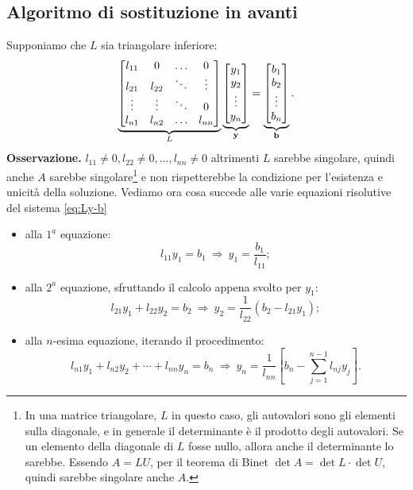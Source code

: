 \subsection{Algoritmo di sostituzione in avanti}
Supponiamo che $\displaystyle L$ sia triangolare inferiore:
\begin{equation}
\underbrace{\begin{bmatrix}
l_{11} & 0 & \dotsc  & 0\\
l_{21} & l_{22} & \ddots  & \vdots \\
\vdots  & \vdots  & \ddots  & 0\\
l_{n1} & l_{n2} & \dotsc  & l_{nn}
\end{bmatrix}}_{L}\underbrace{\begin{bmatrix}
y_{1}\\
y_{2}\\
\vdots \\
y_{n}
\end{bmatrix}}_{\mathbf{y}} =\underbrace{\begin{bmatrix}
b_{1}\\
b_{2}\\
\vdots \\
b_{n}
\end{bmatrix}}_{\mathbf{b}}.
\label{eq:Ly-b}
\end{equation}
\textbf{Osservazione. }$\displaystyle l_{11} \neq 0,l_{22} \neq 0,\dotsc ,l_{nn} \neq 0$ altrimenti $\displaystyle L$ sarebbe singolare, quindi anche $\displaystyle A$ sarebbe singolare\footnote{In una matrice triangolare, $L$ in questo caso, gli autovalori sono gli elementi sulla diagonale, e in generale il determinante è il prodotto degli autovalori. Se un elemento della diagonale di $L$ fosse nullo, allora anche il determinante lo sarebbe. Essendo $A=LU$, per il teorema di Binet $\operatorname{det}A=\operatorname{det}L\cdot\operatorname{det}U$, quindi sarebbe singolare anche $A$.}
e non rispetterebbe la condizione per l'esistenza e unicità della soluzione. Vediamo ora cosa succede alle varie equazioni risolutive del sistema \eqref{eq:Ly-b}
\begin{itemize}
\item alla $1^{a}$ equazione:
\begin{equation*}
l_{11} y_{1} =b_{1} \ \Rightarrow \ y_{1} =\frac{b_{1}}{l_{11}};
\end{equation*}
\item alla $2^{a}$ equazione, sfruttando il calcolo appena svolto per $y_{1}$:
\begin{equation*}
l_{21} y_{1} +l_{22} y_{2} =b_{2} \ \Rightarrow \ y_{2} =\frac{1}{l_{22}}( b_{2} -l_{21} y_{1});
\end{equation*}
\item alla $n$-esima equazione, iterando il procedimento:
\begin{equation*}
l_{n1} y_{1} +l_{n2} y_{2} +\cdots +l_{nn} y_{n} =b_{n} \ \Rightarrow \ y_{n} =\frac{1}{l_{nn}}\left[ b_{n} -\sum ^{n-1}_{j=1} l_{nj} y_{j}\right].
\end{equation*}
\end{itemize}

